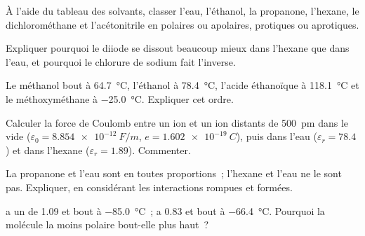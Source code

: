 \begin{exercise}[$\star$]\label{exo:b1:intermolecular-forces-solvents:3}
À l'aide du tableau des solvants, classer l'eau, l'éthanol, la propanone,
l'hexane, le dichlorométhane et l'acétonitrile en polaires ou apolaires,
protiques ou aprotiques.
\end{exercise}

\begin{exercise}[$\star$]\label{exo:b1:intermolecular-forces-solvents:4}
Expliquer pourquoi le diiode se dissout beaucoup mieux dans l'hexane que
dans l'eau, et pourquoi le chlorure de sodium fait l'inverse.
\end{exercise}

\begin{exercise}[$\star\star$]\label{exo:b1:intermolecular-forces-solvents:5}
Le méthanol bout à \qty{64.7}{\celsius}, l'éthanol à \qty{78.4}{\celsius},
l'acide éthanoïque à \qty{118.1}{\celsius} et le méthoxyméthane à
\qty{-25.0}{\celsius}. Expliquer cet ordre.
\end{exercise}

\begin{exercise}[$\star\star$]\label{exo:b1:intermolecular-forces-solvents:6}
Calculer la force de Coulomb entre un ion  et un ion 
distants de \qty{500}{pm} dans le vide ($\varepsilon_0 = \qty{8.854e-12}{F/m}$,
$e = \qty{1.602e-19}{C}$), puis dans l'eau ($\varepsilon_r = 78.4$) et
dans l'hexane ($\varepsilon_r = 1.89$). Commenter.
\end{exercise}

\begin{exercise}[$\star\star$]\label{exo:b1:intermolecular-forces-solvents:7}
La propanone et l'eau sont  en toutes proportions~; l'hexane et
l'eau ne le sont pas. Expliquer, en considérant les interactions rompues
et formées.
\end{exercise}

\begin{exercise}[$\star\star$]\label{exo:b1:intermolecular-forces-solvents:8}
 a un  de \qty{1.09}{\debye} et bout à
\qty{-85.0}{\celsius}~;  a \qty{0.83}{\debye} et bout à
\qty{-66.4}{\celsius}. Pourquoi la molécule la moins polaire bout-elle
plus haut~?
\end{exercise}

